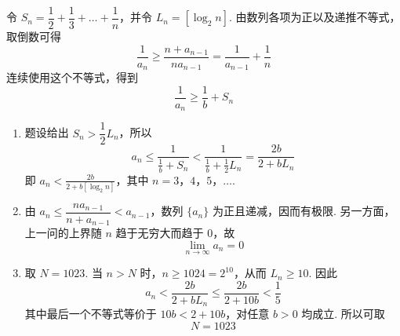 \begin{solution}
令 \(S_n=\dfrac12+\dfrac13+\dots+\dfrac1n\)，并令 \(L_n=\left[\log_{2}n\right]\). 由数列各项为正以及递推不等式，取倒数可得
\[
\frac1{a_n}\geqslant\frac{n+a_{n-1}}{na_{n-1}}=\frac1{a_{n-1}}+\frac1n
\]
连续使用这个不等式，得到
\[
\frac1{a_n}\geqslant\frac1b+S_n
\]

\begin{enumerate}
\item 题设给出 \(S_n>\dfrac12L_n\)，所以
\[
a_n\leqslant\frac{1}{\frac1b+S_n}<\frac{1}{\frac1b+\frac12L_n}=\frac{2b}{2+bL_n}
\]
即 \(a_n<\frac{2b}{2+b\left[\log_{2}n\right]}\)，其中 \(n=3\)，\(4\)，\(5\)，\(\dots\).

\item 由 \(a_n\leqslant\dfrac{na_{n-1}}{n+a_{n-1}}<a_{n-1}\)，数列 \(\{a_n\}\) 为正且递减，因而有极限. 另一方面，上一问的上界随 \(n\) 趋于无穷大而趋于 \(0\)，故
\[
\lim_{n\to\infty}a_n=0
\]

\item 取 \(N=1023\). 当 \(n>N\) 时，\(n\geqslant1024=2^{10}\)，从而 \(L_n\geqslant10\). 因此
\[
a_n<\frac{2b}{2+bL_n}\leqslant\frac{2b}{2+10b}<\frac15
\]
其中最后一个不等式等价于 \(10b<2+10b\)，对任意 \(b>0\) 均成立. 所以可取
\[
N=1023
\]
\end{enumerate}
\end{solution}
